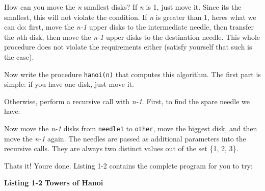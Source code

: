 How can you move the \textit{n} smallest disks? If \textit{n} is
1, just move it. Since it{\textquotesingle}s the
smallest, this will not violate the condition. If \textit{n} is
greater than 1, here{\textquotesingle}s what we can do: first, move the
\textit{n-1} upper disks to the intermediate needle, then transfer the
\textit{n}th disk, then move the \textit{n-1} upper disks to the
destination needle. This whole procedure does not violate the
requirements either (satisfy yourself that such is the case).

Now write the procedure \texttt{hanoi(n)} that computes this algorithm.
The first part is simple: if you have one disk, just move it.


\noindent
Otherwise, perform a recursive call with \textit{n-1}. First, to find
the spare needle we have:


Now move the \textit{n-1} disks from \texttt{needle1} to \texttt{other},
move the biggest disk, and then move the \textit{n-1} again. The
needles are passed as additional parameters into the recursive calls.
They are always two distinct values out of the set \{1, 2, 3\}.


\noindent
That{\textquotesingle}s it! You{\textquotesingle}re done. Listing
1-2 contains the complete program for you to try:

\bigskip

{\sffamily\bfseries Listing 1-2}
{\sffamily\bfseries Towers of Hanoi}


